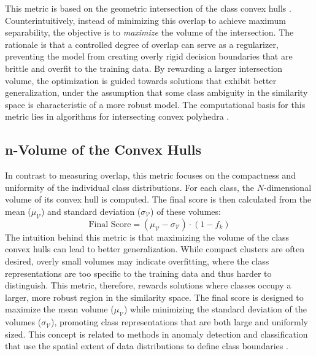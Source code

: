 \documentclass[conference]{IEEEtran}
\begin{document}
This metric is based on the geometric intersection of the class convex hulls \cite{b27, b28}. Counterintuitively, instead of minimizing this overlap to achieve maximum separability, the objective is to \textit{maximize} the volume of the intersection. The rationale is that a controlled degree of overlap can serve as a regularizer, preventing the model from creating overly rigid decision boundaries that are brittle and overfit to the training data. By rewarding a larger intersection volume, the optimization is guided towards solutions that exhibit better generalization, under the assumption that some class ambiguity in the similarity space is characteristic of a more robust model. The computational basis for this metric lies in algorithms for intersecting convex polyhedra \cite{b29, b30}.

\subsection{n-Volume of the Convex Hulls}
In contrast to measuring overlap, this metric focuses on the compactness and uniformity of the individual class distributions. For each class, the $N$-dimensional volume of its convex hull is computed. The final score is then calculated from the mean ($\mu_{\mathcal{V}}$) and standard deviation ($\sigma_{\mathcal{V}}$) of these volumes:
$$\text{Final Score} = (\mu_{\mathcal{V}} - \sigma_{\mathcal{V}}) \cdot (1 - f_k)$$
The intuition behind this metric is that maximizing the volume of the class convex hulls can lead to better generalization. While compact clusters are often desired, overly small volumes may indicate overfitting, where the class representations are too specific to the training data and thus harder to distinguish. This metric, therefore, rewards solutions where classes occupy a larger, more robust region in the similarity space. The final score is designed to maximize the mean volume ($\mu_{\mathcal{V}}$) while minimizing the standard deviation of the volumes ($\sigma_{\mathcal{V}}$), promoting class representations that are both large and uniformly sized. This concept is related to methods in anomaly detection and classification that use the spatial extent of data distributions to define class boundaries \cite{b31, b32, b33}.
\end{document}
